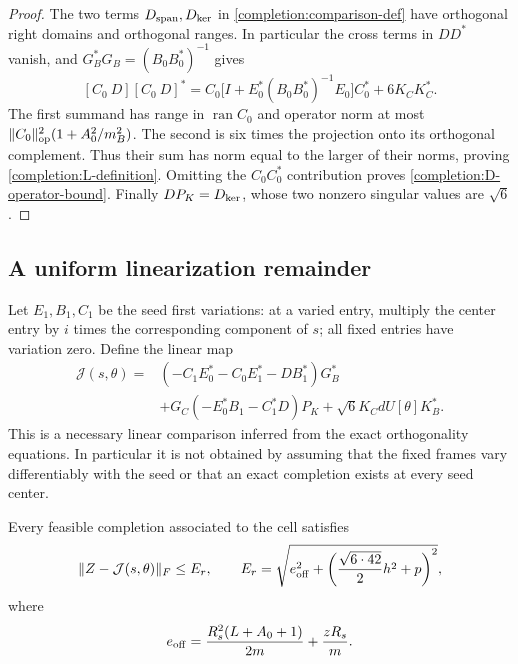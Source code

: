 \begin{proof}
The two terms $D_{\rm span},D_{\rm ker}$ in
\eqref{completion:comparison-def} have orthogonal right domains and
orthogonal ranges.  In particular the cross terms in $DD^*$ vanish, and
$G_B^*G_B=(B_0B_0^*)^{-1}$ gives
\begin{equation}
\label{completion:L-Gram}
 [C_0\ D][C_0\ D]^*
 =C_0\big[I+E_0^*(B_0B_0^*)^{-1}E_0\big]C_0^*
   +6K_CK_C^*.
\end{equation}
The first summand has range in $\operatorname{ran}C_0$ and operator norm at
most $\lVert C_0\rVert_{\rm op}^2(1+A_0^2/m_B^2)$.  The second is six
times the projection onto its orthogonal complement.  Thus their sum has
norm equal to the larger of their norms, proving
\eqref{completion:L-definition}.  Omitting the $C_0C_0^*$ contribution
proves \eqref{completion:D-operator-bound}.  Finally $DP_K=D_{\rm ker}$,
whose two nonzero singular values are $\sqrt6$.
\end{proof}

\subsection{A uniform linearization remainder}

Let $E_1,B_1,C_1$ be the seed first variations: at a varied entry, multiply
the center entry by $i$ times the corresponding component of $s$; all fixed
entries have variation zero.  Define the linear map
\begin{equation}
\label{completion:linear-map}
 \begin{split}
 \mathcal J(s,\theta)={}&
 (-C_1E_0^*-C_0E_1^*-DB_1^*)G_B^*\\
 &+G_C(-E_0^*B_1-C_1^*D)P_K
 +\sqrt6 K_CdU[\theta]K_B^*.
 \end{split}
\end{equation}
This is a necessary linear comparison inferred from the exact
orthogonality equations.  In particular it is not obtained by assuming
that the fixed frames vary differentiably with the seed or that an exact
completion exists at every seed center.

\begin{lemma}
\label{completion:linear-remainder}
Every feasible completion associated to the cell satisfies
\begin{equation}
\label{completion:linear-remainder-bound}
 \lVert Z-\mathcal J(s,\theta)\rVert_F\le E_r,
 \qquad
 E_r=\sqrt{e_{\rm off}^2+
       \left(\frac{\sqrt{6\cdot42}}2h^2+p\right)^2},
\end{equation}
where
\begin{equation}
\label{completion:e-off}
 e_{\rm off}=
 \frac{R_s^2(L+A_0+1)}{2m}+\frac{zR_s}{m}.
\end{equation}
\end{lemma}

